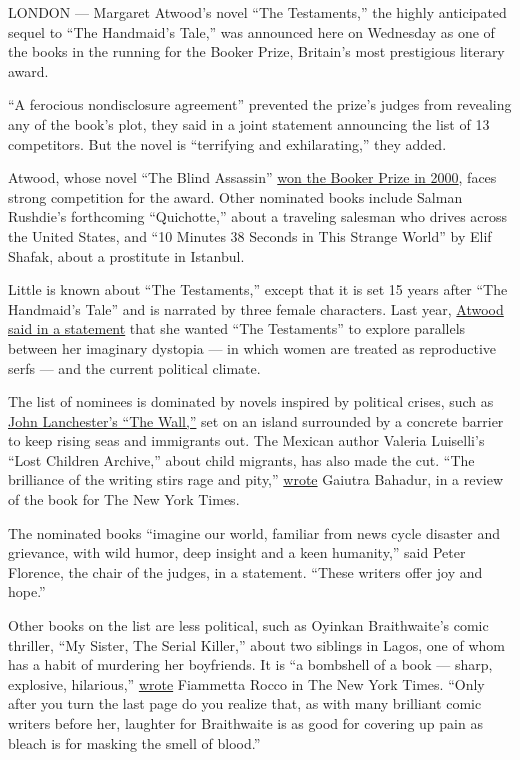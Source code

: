 LONDON --- Margaret Atwood's novel ``The Testaments,'' the highly
anticipated sequel to ``The Handmaid's Tale,'' was announced here on
Wednesday as one of the books in the running for the Booker Prize,
Britain's most prestigious literary award.

``A ferocious nondisclosure agreement'' prevented the prize's judges
from revealing any of the book's plot, they said in a joint statement
announcing the list of 13 competitors. But the novel is ``terrifying and
exhilarating,'' they added.

Atwood, whose novel ``The Blind Assassin''
\href{https://www.nytimes.com/2000/11/08/world/margaret-atwood-is-the-winner-of-britain-s-top-fiction-award.html?searchResultPosition=2}{won
the Booker Prize in 2000}, faces strong competition for the award. Other
nominated books include Salman Rushdie's forthcoming ``Quichotte,''
about a traveling salesman who drives across the United States, and ``10
Minutes 38 Seconds in This Strange World'' by Elif Shafak, about a
prostitute in Istanbul.

Little is known about ``The Testaments,'' except that it is set 15 years
after ``The Handmaid's Tale'' and is narrated by three female
characters. Last year,
\href{https://www.nytimes.com/2018/11/28/books/margaret-atwood-sequel-handmaids-tale-testaments.html}{Atwood
said in a statement} that she wanted ``The Testaments'' to explore
parallels between her imaginary dystopia --- in which women are treated
as reproductive serfs --- and the current political climate.

The list of nominees is dominated by novels inspired by political
crises, such as
\href{https://www.nytimes.com/2019/03/05/books/review/john-lanchester-wall.html}{John
Lanchester's ``The Wall,''} set on an island surrounded by a concrete
barrier to keep rising seas and immigrants out. The Mexican author
Valeria Luiselli's ``Lost Children Archive,'' about child migrants, has
also made the cut. ``The brilliance of the writing stirs rage and
pity,''
\href{https://www.nytimes.com/2019/03/06/books/review/lost-children-archive-valeria-luiselli.html}{wrote}
Gaiutra Bahadur, in a review of the book for The New York Times.

The nominated books ``imagine our world, familiar from news cycle
disaster and grievance, with wild humor, deep insight and a keen
humanity,'' said Peter Florence, the chair of the judges, in a
statement. ``These writers offer joy and hope.''

Other books on the list are less political, such as Oyinkan
Braithwaite's comic thriller, ``My Sister, The Serial Killer,'' about
two siblings in Lagos, one of whom has a habit of murdering her
boyfriends. It is ``a bombshell of a book --- sharp, explosive,
hilarious,''
\href{https://www.nytimes.com/2019/01/09/books/review/oyinkan-braithwaite-my-sister-the-serial-killer.html?searchResultPosition=2}{wrote}
Fiammetta Rocco in The New York Times. ``Only after you turn the last
page do you realize that, as with many brilliant comic writers before
her, laughter for Braithwaite is as good for covering up pain as bleach
is for masking the smell of blood.''

